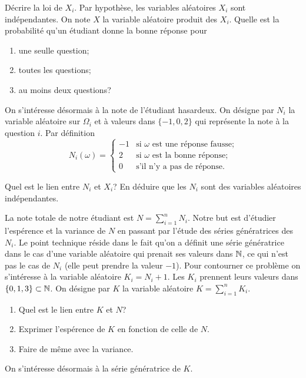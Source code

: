 \documentclass[11pt, a4paper]{article}
\begin{document}
\begin{question}{4}
  Décrire la loi de $X_i$. Par hypothèse, les variables aléatoires
  $X_i$ sont indépendantes. On note $X$ la variable aléatoire produit
  des $X_i$. Quelle est la probabilité qu'un étudiant donne la bonne
  réponse pour
  \begin{enumerate}
  \item une seulle question;
  \item toutes les questions;
  \item au moins deux questions?
  \end{enumerate}
\end{question}
On s'intéresse désormais à la note de l'étudiant hasardeux. On désigne
par $N_i$ la variable aléatoire sur $\Omega_i$ et à valeurs dans
$\{-1, 0, 2\}$ qui représente la note à la question $i$. Par
définition
\[
N_i(\omega) = \left\{
  \begin{matrix}
    -1 & \textrm{si $\omega$ est une réponse fausse;}\\
    2 & \textrm{si $\omega$ est la bonne réponse;}\\
    0 & \textrm{s'il n'y a pas de réponse.}
  \end{matrix}
  \right.
\]
\begin{question}{1}
  Quel est le lien entre $N_i$ et $X_i$? En déduire que les $N_i$ sont
  des variables aléatoires indépendantes.
\end{question}
La note totale de notre étudiant est $N = \sum_{i=1}^n N_i$. Notre but
est d'étudier l'espérence et la variance de $N$ en passant par l'étude
des séries génératrices des $N_i$. Le point technique réside dans le
fait qu'on a définit une série génératrice dans le cas d'une variable
aléatoire qui prenait ses valeurs dans $\mathbb{N}$, ce qui n'est pas le cas
de $N_i$ (elle peut prendre la valeur $-1$). Pour contourner ce
problème on s'intéresse à la variable aléatoire $K_i = N_i + 1$. Les
$K_i$ prennent leurs valeurs dans $\{0, 1, 3\} \subset \mathbb{N}$. On désigne
par $K$ la variable aléatoire $K = \sum_{i=1}^n K_i$.
\begin{question}{3}
  \begin{enumerate}
  \item Quel est le lien entre $K$ et $N$?
  \item Exprimer l'espérence de $K$ en fonction de celle de $N$.
  \item Faire de même avec la variance.
  \end{enumerate}
\end{question}
On s'intéresse désormais à la série génératrice de $K$.
\end{document}
